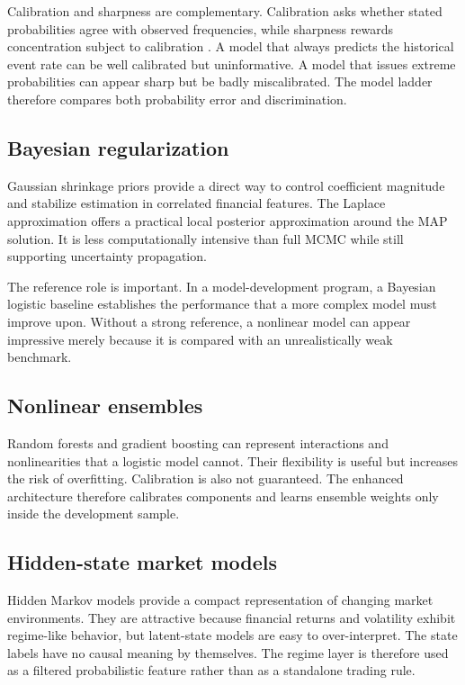 \documentclass[11pt]{article}
\begin{document}
Calibration and sharpness are complementary. Calibration asks whether stated probabilities agree with observed frequencies, while sharpness rewards concentration subject to calibration \citep{gneiting2007calibration}. A model that always predicts the historical event rate can be well calibrated but uninformative. A model that issues extreme probabilities can appear sharp but be badly miscalibrated. The model ladder therefore compares both probability error and discrimination.

\subsection{Bayesian regularization}
Gaussian shrinkage priors provide a direct way to control coefficient magnitude and stabilize estimation in correlated financial features. The Laplace approximation offers a practical local posterior approximation around the MAP solution. It is less computationally intensive than full MCMC while still supporting uncertainty propagation.

The reference role is important. In a model-development program, a Bayesian logistic baseline establishes the performance that a more complex model must improve upon. Without a strong reference, a nonlinear model can appear impressive merely because it is compared with an unrealistically weak benchmark.

\subsection{Nonlinear ensembles}
Random forests \citep{breiman2001random} and gradient boosting \citep{friedman2001greedy} can represent interactions and nonlinearities that a logistic model cannot. Their flexibility is useful but increases the risk of overfitting. Calibration is also not guaranteed. The enhanced architecture therefore calibrates components and learns ensemble weights only inside the development sample.

\subsection{Hidden-state market models}
Hidden Markov models provide a compact representation of changing market environments. They are attractive because financial returns and volatility exhibit regime-like behavior, but latent-state models are easy to over-interpret. The state labels have no causal meaning by themselves. The regime layer is therefore used as a filtered probabilistic feature rather than as a standalone trading rule.
\end{document}

